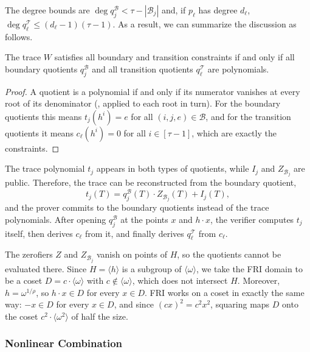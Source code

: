 \documentclass[../../book]{subfiles}
\begin{document}
The degree bounds are $\deg q^{\mathcal{B}}_j < \tau - |\mathcal{B}_j|$ and, if $p_\ell$ has degree $d_\ell$, $\deg q^{\mathcal{T}}_\ell \leq (d_\ell - 1)(\tau - 1)$. As a result, we can summarize the discussion as follows.

\begin{proposition}\label{prop:stark-quotients}
  The trace $W$ satisfies all boundary and transition constraints if and only if all boundary quotients $q^{\mathcal{B}}_j$ and all transition quotients $q^{\mathcal{T}}_\ell$ are polynomials.
\end{proposition}

\begin{proof}
  A quotient is a polynomial if and only if its numerator vanishes at every root of its denominator (, applied to each root in turn). For the boundary quotients this means $t_j(h^i) = e$ for all $(i,j,e) \in \mathcal{B}$, and for the transition quotients it means $c_\ell(h^i) = 0$ for all $i \in [\tau-1]$, which are exactly the constraints.
\end{proof}

The trace polynomial $t_j$ appears in both types of quotients, while $I_j$ and $Z_{\mathcal{B}_j}$ are public. Therefore, the trace can be reconstructed from the boundary quotient,
\begin{equation*}
  t_j(T) = q^{\mathcal{B}}_j(T) \cdot Z_{\mathcal{B}_j}(T) + I_j(T),
\end{equation*}
and the prover commits to the boundary quotients instead of the trace polynomials. After opening $q^{\mathcal{B}}_j$ at the points $x$ and $h \cdot x$, the verifier computes $t_j$ itself, then derives $c_\ell$ from it, and finally derives $q^{\mathcal{T}}_\ell$ from $c_\ell$.

\begin{remark}
  The zerofiers $Z$ and $Z_{\mathcal{B}_j}$ vanish on points of $H$, so the quotients cannot be evaluated there. Since $H = \langle h \rangle$ is a subgroup of $\langle \omega \rangle$, we take the FRI domain to be a coset $D = c \cdot \langle \omega \rangle$ with $c \notin \langle \omega \rangle$, which does not intersect $H$. Moreover, $h = \omega^{1/\rho}$, so $h \cdot x \in D$ for every $x \in D$. FRI works on a coset in exactly the same way: $-x \in D$ for every $x \in D$, and since $(cx)^2 = c^2 x^2$, squaring maps $D$ onto the coset $c^2 \cdot \langle \omega^2 \rangle$ of half the size.
\end{remark}

\subsubsection{Nonlinear Combination}
\end{document}
